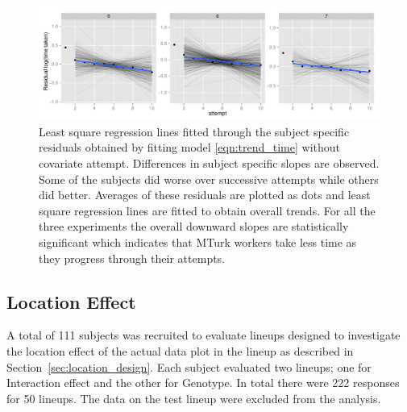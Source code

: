 \documentclass[10pt]{article}\usepackage[]{graphicx}\usepackage[]{color}
\begin{document}

\begin{figure}[htbp] 
   \centering
 \includegraphics[width=6.3in]{learning_trend_time_subject.pdf}    
   \caption{Least square regression lines fitted through the subject specific residuals obtained by  fitting model \eqref{eqn:trend_time} without covariate attempt. Differences in subject specific slopes are observed. Some of the subjects did worse over successive attempts while others did better. Averages of these residuals are plotted as dots and least square regression lines are fitted to obtain overall trends. For all the three experiments the overall downward slopes are statistically significant which indicates that MTurk workers take less time as they progress through their attempts.}
   \label{fig:learning_trend_time}
\end{figure}

\subsection{Location Effect}

A total of 111 subjects was recruited to evaluate lineups designed to investigate the location effect of the actual data plot in the lineup as described in Section~\ref{sec:location_design}. Each subject evaluated two lineups;  one for Interaction effect and the other for Genotype.  In total there were 222 responses for 50 lineups. The data on the test lineup were excluded from the analysis.
\end{document}
